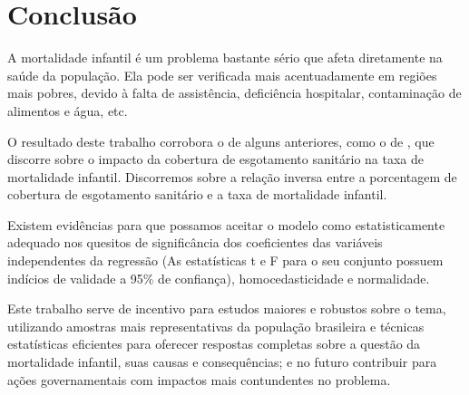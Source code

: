 \chapter{Conclusão}
\label{cap:conclusao}

A mortalidade infantil é um problema bastante sério que afeta diretamente na saúde da população.
Ela pode ser verificada mais acentuadamente em regiões mais pobres, devido à falta de assistência, deficiência
hospitalar, contaminação de alimentos e água, etc.

O resultado deste trabalho corrobora o de alguns anteriores, como o de \cite{teixeira2011analise}, que
discorre sobre o impacto da cobertura de esgotamento sanitário na taxa de mortalidade infantil. Discorremos
sobre a relação inversa entre a porcentagem de cobertura de esgotamento sanitário e a taxa de mortalidade
infantil.

Existem evidências para que possamos aceitar o modelo como estatisticamente adequado nos quesitos de
significância dos coeficientes das variáveis independentes da regressão (As estatísticas t e F para o seu
conjunto possuem indícios de validade a 95\% de confiança), homocedasticidade e normalidade.

Este trabalho serve de incentivo para estudos maiores e robustos sobre o tema, utilizando amostras
mais representativas da população brasileira e técnicas estatísticas eficientes para oferecer respostas
completas sobre a questão da mortalidade infantil, suas causas e consequências; e no futuro contribuir
para ações governamentais com impactos mais contundentes no problema.
